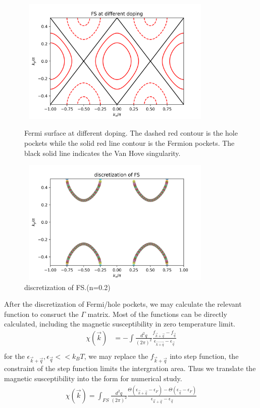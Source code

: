 \documentclass[12pt]{article}
\numberwithin{equation}{section}
\begin{document}
\begin{figure}[htbp]
	\begin{minipage}[t]{0.5\linewidth}
	\centering
	\includegraphics[height=6cm,width=9.5cm]{Fermisurface.png}
	\caption{Fermi surface at different doping. The dashed red contour is the hole pockets while the solid red line contour is the Fermion pockets. The black solid line indicates the Van Hove singularity.}
	\end{minipage}
	\hfill
	\begin{minipage}[t]{0.5\linewidth}
	\centering
	\includegraphics[height=6cm,width=9.5cm]{DFS.png}
	\caption{discretization of FS.(n=0.2)}
	\end{minipage}
\end{figure}
After the discretization of Fermi/hole pockets, we may calculate the relevant function to consruct the $\Gamma$ matrix. Most of the functions can be directly calculated, including the magnetic susceptibility in zero temperature limit.
\begin{equation}
	\begin{aligned}
	\chi(\vec{k}) & = -\int \frac{d^2q}{(2\pi)^2} \frac{f_{\vec{k}+\vec{q}}-f_{\vec{q}}}{\epsilon_{\vec{k+q}}-\epsilon_{\vec{q}}}\\
	\end{aligned}
\end{equation} 
for the $\epsilon_{\vec{k}+\vec{q}}, \epsilon_{\vec{q}}<<k_BT$, we may replace the $f_{\vec{k}+\vec{q}}$ into step function, the constraint of the step function limits the intergration area. Thus we translate the magnetic susceptibility into the form for numerical study. 
\begin{equation}
	\begin{aligned}
	\chi(\vec{k}) = \int_{FS} \frac{d^2q}{(2\pi)^2} \frac{\Theta(\epsilon_{\vec{k}+\vec{q}}-\epsilon_F)-\Theta(\epsilon_{\vec{q}}-\epsilon_F)}{\epsilon_{\vec{k}+\vec{q}}-\epsilon_{\vec{q}}}\\
	\end{aligned}
\end{equation} 
\end{document}
